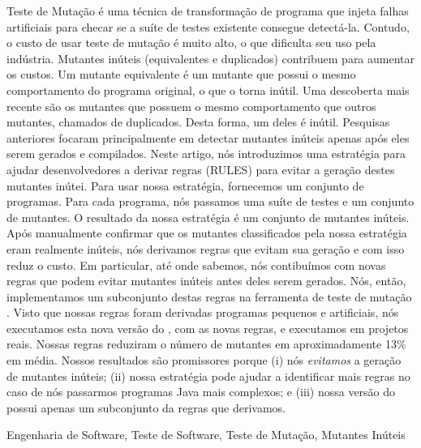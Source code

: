 Teste de Mutação é uma técnica de transformação de programa que injeta falhas artificiais para checar se a suíte de testes existente consegue detectá-la. Contudo, o custo de usar teste de mutação é muito alto, o que dificulta seu uso pela indústria. Mutantes inúteis (equivalentes e duplicados) contribuem para aumentar os custos. Um mutante equivalente é um mutante que possui o mesmo comportamento do programa original, o que o torna inútil. Uma descoberta mais recente são os mutantes que possuem o mesmo comportamento que outros mutantes, chamados de duplicados. Desta forma, um deles é inútil. Pesquisas anteriores focaram principalmente em detectar mutantes inúteis apenas após eles serem gerados e compilados. Neste artigo, nós introduzimos uma estratégia para ajudar desenvolvedores a derivar regras (RULES) para evitar a geração destes mutantes inútei. Para usar nossa estratégia, fornecemos um conjunto de programas. Para cada programa, nós passamos uma suíte de testes e um conjunto de mutantes. O resultado da nossa estratégia é um conjunto de mutantes inúteis. Após manualmente confirmar que os mutantes classificados pela nossa estratégia eram realmente inúteis, nós derivamos regras que evitam sua geração e com isso reduz o custo. Em particular, até onde sabemos, nós contibuímos com \NumberOfNewHeuristics novas regras que podem evitar mutantes inúteis antes deles serem gerados. Nós, então, implementamos um subconjunto destas regras na ferramenta de teste de mutação \mujava{}. Visto que nossas regras foram derivadas programas pequenos e artificiais, nós executamos esta nova versão do \mujava{}, com as novas regras, e executamos em projetos reais. Nossas regras reduziram o número de mutantes em aproximadamente 13\% em média. Nossos resultados são promissores porque (i) nós \textit{evitamos} a geração de mutantes inúteis; (ii) nossa estratégia pode ajudar a identificar mais regras no caso de nós passarmos programas Java mais complexos; e (iii) nossa versão do \mujava{} possui apenas um subconjunto da regras que derivamos.

\begin{keywords}
	Engenharia de Software, Teste de Software, Teste de Mutação, Mutantes Inúteis
\end{keywords}